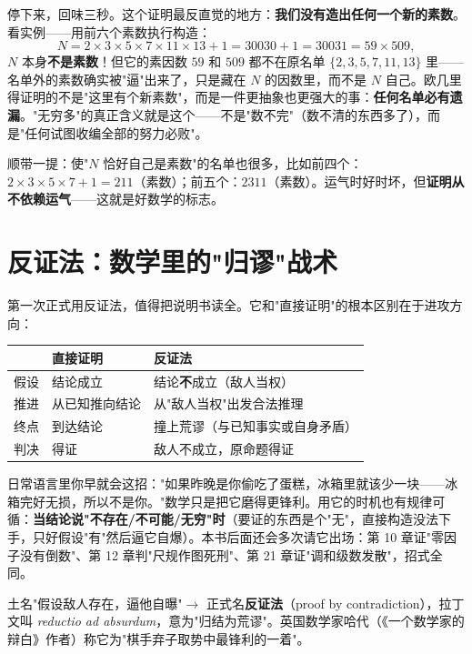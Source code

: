 停下来，回味三秒。这个证明最反直觉的地方：\textbf{我们没有造出任何一个新的素数}。看实例——用前六个素数执行构造：
\[
N = 2\times3\times5\times7\times11\times13 + 1 = 30030 + 1 = 30031 = 59 \times 509 ,
\]
$N$ 本身\textbf{不是素数}！但它的素因数 $59$ 和 $509$ 都不在原名单 $\{2,3,5,7,11,13\}$ 里——名单外的素数确实被"逼"出来了，只是藏在 $N$ 的因数里，而不是 $N$ 自己。欧几里得证明的不是"这里有个新素数"，而是一件更抽象也更强大的事：\textbf{任何名单必有遗漏}。"无穷多"的真正含义就是这个——不是"数不完"（数不清的东西多了），而是"任何试图收编全部的努力必败"。

顺带一提：使"$N$ 恰好自己是素数"的名单也很多，比如前四个：$2\times3\times5\times7+1 = 211$（素数）；前五个：$2311$（素数）。运气时好时坏，但\textbf{证明从不依赖运气}——这就是好数学的标志。

\section{反证法：数学里的"归谬"战术}

第一次正式用反证法，值得把说明书读全。它和"直接证明"的根本区别在于进攻方向：

\begin{center}
\begin{tabular}{lp{}p{}}
\toprule
 & 直接证明 & 反证法 \\
\midrule
假设 & 结论成立 & 结论\textbf{不}成立（敌人当权） \\
推进 & 从已知推向结论 & 从"敌人当权"出发合法推理 \\
终点 & 到达结论 & 撞上荒谬（与已知事实或自身矛盾） \\
判决 & 得证 & 敌人不成立，原命题得证 \\
\bottomrule
\end{tabular}
\end{center}

日常语言里你早就会这招："如果昨晚是你偷吃了蛋糕，冰箱里就该少一块——冰箱完好无损，所以不是你。"数学只是把它磨得更锋利。用它的时机也有规律可循：\textbf{当结论说"不存在/不可能/无穷"时}（要证的东西是个"无"，直接构造没法下手，只好假设"有"然后逼它自爆）。本书后面还会多次请它出场：第 10 章证"零因子没有倒数"、第 12 章判"尺规作图死刑"、第 21 章证"调和级数发散"，招式全同。

\begin{cidian}
土名"假设敌人存在，逼他自曝"$\to$ 正式名\textbf{反证法}（proof by contradiction），拉丁文叫 \textit{reductio ad absurdum}，意为"归结为荒谬"。英国数学家哈代（《一个数学家的辩白》作者）称它为"棋手弃子取势中最锋利的一着"。
\end{cidian}

